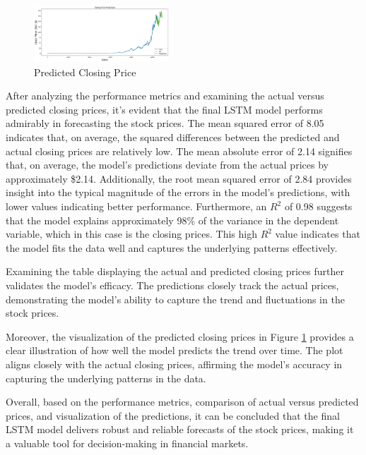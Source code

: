 \documentclass[10pt,twocolumn,letterpaper]{article}
\begin{document}
\begin{figure}[H]
\centering
\includegraphics[width=0.45\textwidth]{final_model_predictions.png}
\caption{Predicted Closing Price}
\label{fig:predicted_closing_price}
\end{figure}

After analyzing the performance metrics and examining the actual versus predicted 
closing prices, it's evident that the final LSTM model performs admirably in 
forecasting the stock prices. The mean squared error of 8.05 indicates that, 
on average, the squared differences between the predicted and actual closing prices 
are relatively low. The mean absolute error of 2.14 signifies that, on average, 
the model's predictions deviate from the actual prices by approximately \$2.14. 
Additionally, the root mean squared error of 2.84 provides insight into the 
typical magnitude of the errors in the model's predictions, with lower values indicating 
better performance. Furthermore, an $R^2$ of 0.98 suggests that the model explains 
approximately 98\% of the variance in the dependent variable, which in this case is the 
closing prices. This high $R^2$ value indicates that the model fits the data well and 
captures the underlying patterns effectively.

Examining the table displaying the actual and predicted closing prices further validates 
the model's efficacy. The predictions closely track the actual prices, demonstrating the 
model's ability to capture the trend and fluctuations in the stock prices.

Moreover, the visualization of the predicted closing prices in Figure 
\ref{fig:predicted_closing_price} provides a clear illustration of how well the model predicts 
the trend over time. The plot aligns closely with the actual closing prices, affirming the 
model's accuracy in capturing the underlying patterns in the data.

Overall, based on the performance metrics, comparison of actual versus predicted prices, 
and visualization of the predictions, it can be concluded that the final LSTM model delivers 
robust and reliable forecasts of the stock prices, making it a valuable tool for decision-making 
in financial markets.
\end{document}

